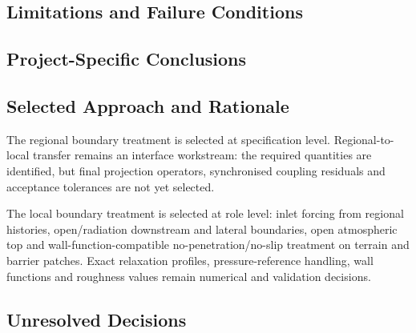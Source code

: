 
\subsection{Limitations and Failure Conditions}
\label{sec:res-num-ibc-limitations}


\subsection{Project-Specific Conclusions}
\label{sec:res-num-ibc-conclusions}


\subsection{Selected Approach and Rationale}
\label{sec:res-num-ibc-selected-approach}


The regional boundary treatment is selected at specification level.
Regional-to-local transfer remains an interface workstream: the required
quantities are identified, but final projection operators, synchronised
coupling residuals and acceptance tolerances are not yet selected.

The local boundary treatment is selected at role level: inlet forcing
from regional histories, open/radiation downstream and lateral
boundaries, open atmospheric top and wall-function-compatible
no-penetration/no-slip treatment on terrain and barrier patches. Exact
relaxation profiles, pressure-reference handling, wall functions and
roughness values remain numerical and validation decisions.

\subsection{Unresolved Decisions}
\label{sec:res-num-ibc-unresolved-decisions}


